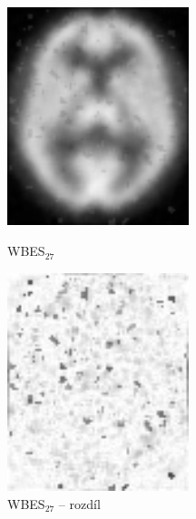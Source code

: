     \begin{figure}[h]
        \begin{minipage}[l]{0.5\textwidth}
            \center
            \includegraphics[width = 150pt]{src/8Appendix/final/10-100wbes.png}
            \caption{WBES$_{27}$}
        \end{minipage}
        \begin{minipage}[r]{0.5\textwidth}
            \center
            \includegraphics[width = 150pt]{src/8Appendix/final/10-100wbesD.png}
            \caption{WBES$_{27}$ -- rozdíl}
        \end{minipage}
    \end{figure}
    
